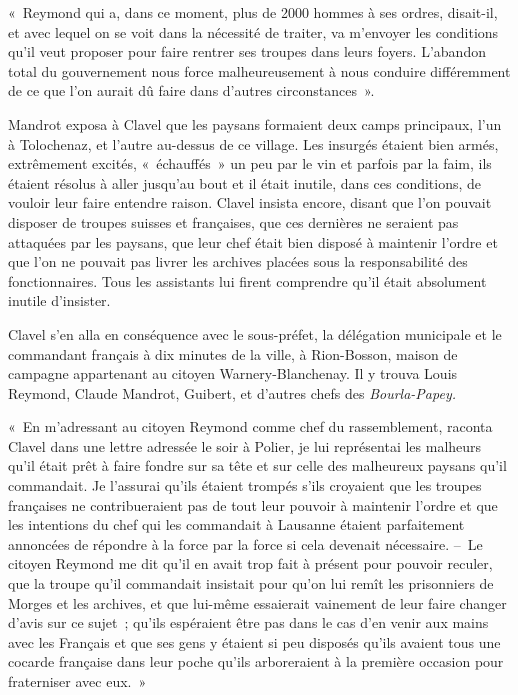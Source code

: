 \documentclass[french,twoside]{book} %
\newenvironment{quoteblock}%
  {\begin{quoting}}
  {\end{quoting}}
\newenvironment{quotebar}{%
    \def\FrameCommand{{\color{rubric!10!}\vrule width 0.5em} \hspace{0.9em}}%
    \def\OuterFrameSep{\itemsep} %
    \MakeFramed {\advance\hsize-\width \FrameRestore}
  }%
  {%
    \endMakeFramed
  }
\renewenvironment{quoteblock}%
  {%
    \savenotes
    \setstretch{0.9}
    \normalfont
    \begin{quotebar}
  }
  {%
    \end{quotebar}
    \spewnotes
  }
\begin{document}
\begin{quoteblock}
 \noindent « Reymond qui a, dans ce moment, plus de 2000 hommes à ses ordres, disait-il, et avec lequel on se voit dans la nécessité de traiter, va m’envoyer les conditions qu’il veut proposer pour faire rentrer ses troupes dans leurs foyers. L’abandon total du gouvernement nous force malheureusement à nous conduire différemment de ce que l’on aurait dû faire dans d’autres circonstances ».
 \end{quoteblock}

\noindent Mandrot exposa à Clavel que les paysans formaient deux camps principaux, l’un à Tolochenaz, et l’autre au-dessus de ce village. Les insurgés étaient bien armés, extrêmement excités, « échauffés » un peu par le vin et parfois par la faim, ils étaient résolus à aller jusqu’au bout et il était inutile, dans ces conditions, de vouloir leur faire entendre raison. Clavel insista encore, disant que l’on pouvait disposer de troupes suisses et françaises, que ces dernières ne seraient pas attaquées par les paysans, que leur chef était bien disposé à maintenir l’ordre et que l’on ne pouvait pas livrer les archives placées sous la responsabilité des fonctionnaires. Tous les assistants lui firent comprendre qu’il était absolument inutile d’insister.\par
Clavel s’en alla en conséquence avec le sous-préfet, la délégation municipale et le commandant français à dix minutes de la ville, à Rion-Bosson, maison de campagne appartenant au citoyen Warnery-Blanchenay. Il y trouva Louis Reymond, Claude Mandrot, Guibert, et d’autres chefs des \emph{Bourla-Papey.}\par

\begin{quoteblock}
 \noindent « En m’adressant au citoyen Reymond comme chef du rassemblement, raconta Clavel dans une lettre adressée le soir à Polier, je lui représentai les malheurs qu’il était prêt à faire fondre sur sa tête et sur celle des malheureux paysans qu’il commandait. Je l’assurai qu’ils étaient trompés s’ils croyaient que les troupes françaises ne contribueraient pas de tout leur pouvoir à maintenir l’ordre et que les intentions du chef qui les commandait à Lausanne étaient parfaitement annoncées de répondre à la force par la force si cela devenait nécessaire. – Le citoyen Reymond me dit qu’il en avait trop fait à présent pour pouvoir reculer, que la troupe qu’il commandait insistait pour qu’on lui remît les prisonniers de Morges et les archives, et que lui-même essaierait vainement de leur faire changer d’avis sur ce sujet ; qu’ils espéraient être pas dans le cas d’en venir aux mains avec les Français et que ses gens y étaient si peu disposés qu’ils avaient tous une cocarde française dans leur poche qu’ils arboreraient à la première occasion pour fraterniser avec eux. »
 \end{quoteblock}
\end{document}
